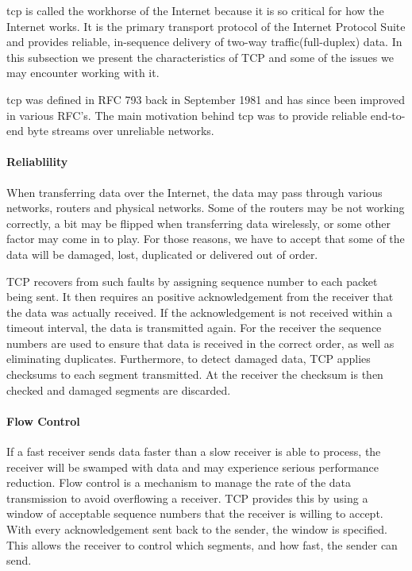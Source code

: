 \gls{tcp} is called the workhorse of the Internet because it is so critical for
how the Internet works. It is the primary transport protocol of the Internet
Protocol Suite\cite{rfc-1122} and provides reliable, in-sequence delivery of
two-way traffic(full-duplex) data.  In this subsection we present the
characteristics of TCP and some of the issues we may encounter working with it.

\gls{tcp} was defined in RFC 793\cite{rfc-793} back in September 1981 and has
since been improved in various RFC's. The main motivation behind \gls{tcp} was
to provide reliable end-to-end byte streams over unreliable networks.

\paragraph{Reliablility}

When transferring data over the Internet, the data may pass through various
networks, routers and physical networks. Some of the routers may be not working
correctly, a bit may be flipped when transferring data wirelessly, or some other
factor may come in to play. For those reasons, we have to accept that some of
the data will be damaged, lost, duplicated or delivered out of order.

TCP recovers from such faults by assigning sequence number to each packet being
sent. It then requires an positive acknowledgement from the receiver that the
data was actually received. If the acknowledgement is not received within a
timeout interval, the data is transmitted again. For the receiver the sequence
numbers are used to ensure that data is received in the correct order, as well
as eliminating duplicates. Furthermore, to detect damaged data, TCP applies
checksums to each segment transmitted. At the receiver the checksum is then
checked and damaged segments are discarded.

\paragraph{Flow Control}

If a fast receiver sends data faster than a slow receiver is able to process,
the receiver will be swamped with data and may experience serious performance
reduction. Flow control is a mechanism to manage the rate of the data
transmission to avoid overflowing a receiver. TCP provides this by using a
window of acceptable sequence numbers that the receiver is willing to accept.
With every acknowledgement sent back to the sender, the window is specified.
This allows the receiver to control which segments, and how fast, the sender
can send.

